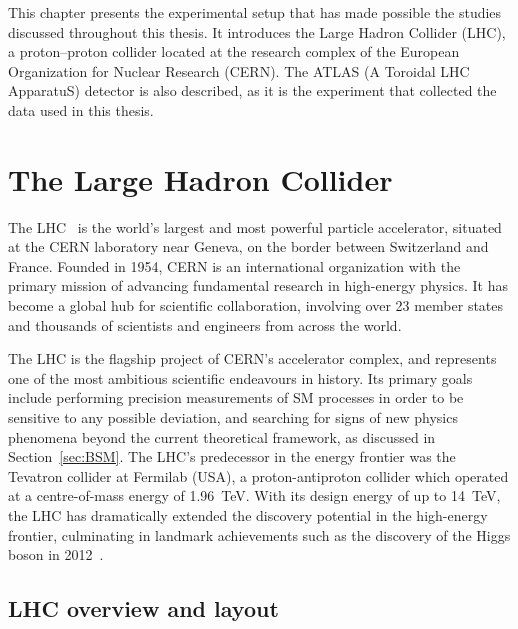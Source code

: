 This chapter presents the experimental setup that has made possible the studies discussed throughout this thesis. It introduces the Large Hadron Collider (LHC), a proton--proton collider located at the research complex of the European Organization for Nuclear Research (CERN). The ATLAS (A Toroidal LHC ApparatuS) detector is also described, as it is the experiment that collected the data used in this thesis.

\section{The Large Hadron Collider}
\label{sec:LHC}

The LHC~\cite{Evans:1129806, Bruning:782076} is the world's largest and most powerful particle accelerator, situated at the CERN laboratory near Geneva, on the border between Switzerland and France. Founded in 1954, CERN is an international organization with the primary mission of advancing fundamental research in high-energy physics. It has become a global hub for scientific collaboration, involving over 23 member states and thousands of scientists and engineers from across the world.

The LHC is the flagship project of CERN's accelerator complex, and represents one of the most ambitious scientific endeavours in history. Its primary goals include performing precision measurements of SM processes in order to be sensitive to any possible deviation, and searching for signs of new physics phenomena beyond the current theoretical framework, as discussed in Section~\ref{sec:BSM}. The LHC's predecessor in the energy frontier was the Tevatron collider at Fermilab (USA), a proton-antiproton collider which operated at a centre-of-mass energy of 1.96~TeV. With its design energy of up to 14~TeV, the LHC has dramatically extended the discovery potential in the high-energy frontier, culminating in landmark achievements such as the discovery of the Higgs boson in 2012~\cite{ATLAS:2012yve,CMS:2012qbp}.

\subsection{LHC overview and layout}


